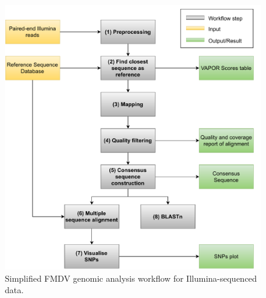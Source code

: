\begin{figure}[ht!]
	\includegraphics[width=1\textwidth]{media/3-fmdv.pdf}
	\caption{Simplified \ac{FMDV} genomic analysis workflow for Illumina-sequenced data.}
	\label{fig:3-fmdv-wf}
\end{figure}

